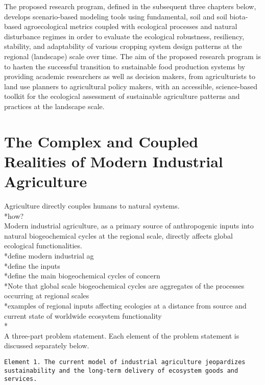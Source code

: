 \documentclass[twoside]{article}	%
\begin{document}
The proposed research program, defined in the subsequent three chapters below, develops scenario-based modeling tools using fundamental, soil and soil biota-based agroecological metrics coupled with ecological processes and natural disturbance regimes in order to evaluate the ecological robustness, resiliency, stability, and adaptability of various cropping system design patterns at the regional (landscape) scale over time. The aim of the proposed research program is to hasten the successful transition to sustainable food production systems by providing academic researchers as well as decision makers, from agriculturists to land use planners to agricultural policy makers, with an accessible, science-based toolkit for the ecological assessment of sustainable agriculture patterns and practices at the landscape scale.

\newpage
\section{The Complex and Coupled Realities of Modern Industrial Agriculture}
Agriculture directly couples humans to natural systems.\\
*how?\\



Modern industrial agriculture, as a primary source of anthropogenic inputs into natural biogeochemical cycles at the regional scale, directly affects global ecological functionalities.\\

*define modern industrial ag\\
*define the inputs\\
*define the main biogeochemical cycles of concern\\
*Note that global scale biogeochemical cycles are aggregates of the processes occurring at regional scales\\
*examples of regional inputs affecting ecologies at a distance from source and current state of worldwide ecosystem functionality\\
*\\


A three-part problem statement. Each element of the problem statement is discussed separately below.\\ 

\begin{sloppypar}
\texttt{Element 1. The current model of industrial agriculture jeopardizes sustainability and the long-term delivery of ecosystem goods and services.}\\
\end{sloppypar}
\end{document}
